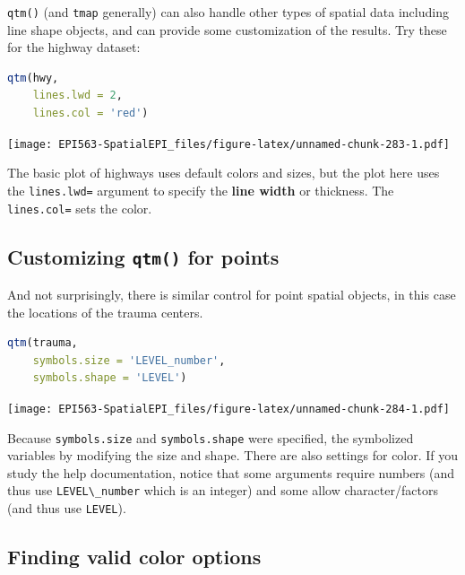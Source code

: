 \documentclass[
]{book}
\newcommand{\passthrough}[1]{#1}
\begin{document}
\passthrough{\lstinline!qtm()!} (and \passthrough{\lstinline!tmap!} generally) can also handle other types of spatial data including line shape objects, and can provide some customization of the results. Try these for the highway dataset:

\begin{lstlisting}[language=R]
qtm(hwy, 
    lines.lwd = 2, 
    lines.col = 'red')
\end{lstlisting}

\texttt{[image: EPI563-SpatialEPI\_files/figure-latex/unnamed-chunk-283-1.pdf]}

The basic plot of highways uses default colors and sizes, but the plot here uses the \passthrough{\lstinline!lines.lwd=!} argument to specify the \textbf{line width} or thickness. The \passthrough{\lstinline!lines.col=!} sets the color.

\hypertarget{customizing-qtm-for-points}{%
\subsection{\texorpdfstring{Customizing \texttt{qtm()} for points}{Customizing qtm() for points}}\label{customizing-qtm-for-points}}

And not surprisingly, there is similar control for point spatial objects, in this case the locations of the trauma centers.

\begin{lstlisting}[language=R]
qtm(trauma,
    symbols.size = 'LEVEL_number', 
    symbols.shape = 'LEVEL')
\end{lstlisting}

\texttt{[image: EPI563-SpatialEPI\_files/figure-latex/unnamed-chunk-284-1.pdf]}

Because \passthrough{\lstinline!symbols.size!} and \passthrough{\lstinline!symbols.shape!} were specified, the symbolized variables by modifying the size and shape. There are also settings for color. If you study the help documentation, notice that some arguments require numbers (and thus use \passthrough{\lstinline!LEVEL\_number!} which is an integer) and some allow character/factors (and thus use \passthrough{\lstinline!LEVEL!}).

\hypertarget{finding-valid-color-options}{%
\subsection{Finding valid color options}\label{finding-valid-color-options}}
\end{document}
